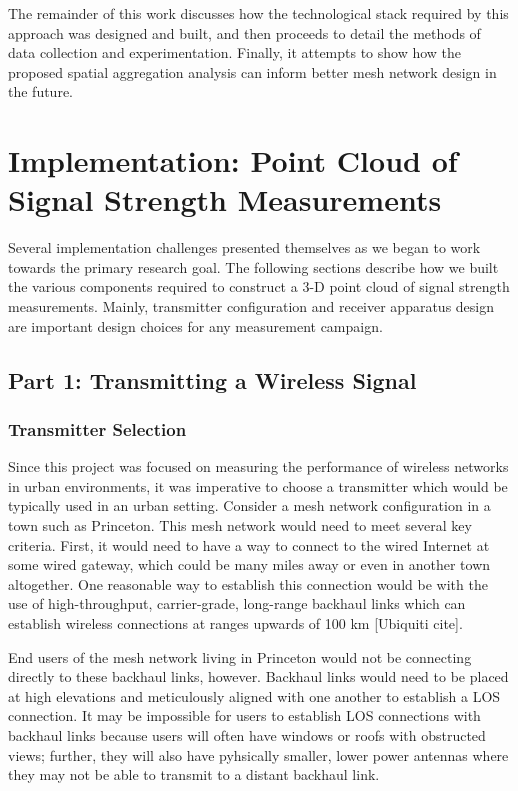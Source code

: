 \documentclass[pageno]{jpaper}
\begin{document}
The remainder of this work discusses how the technological stack required by this approach was designed and built, and then proceeds to detail the methods of data collection and experimentation. Finally, it attempts to show how the proposed spatial aggregation analysis can inform better mesh network design in the future.

\section{Implementation: Point Cloud of Signal Strength Measurements}
Several implementation challenges presented themselves as we began to work towards the primary research goal. The following sections describe how we built the various components required to construct a 3-D point cloud of signal strength measurements. Mainly, transmitter configuration and receiver apparatus design are  important design choices for any measurement campaign.

\subsection{Part 1: Transmitting a Wireless Signal}

\subsubsection{Transmitter Selection}
Since this project was focused on measuring the performance of wireless networks in urban environments, it was imperative to choose a transmitter which would be typically used in an urban setting. Consider a mesh network configuration in a town such as Princeton. This mesh network would need to meet several key criteria. First, it would need to have a way to connect to the wired Internet at some wired gateway, which could be many miles away or even in another town altogether. One reasonable way to establish this connection would be with the use of high-throughput, carrier-grade, long-range backhaul links which can establish wireless connections at ranges upwards of 100 km [Ubiquiti cite].

End users of the mesh network living in Princeton would not be connecting directly to these backhaul links, however. Backhaul links would need to be placed at high elevations and meticulously aligned with one another to establish a LOS connection. It may be impossible for users to establish LOS connections with backhaul links because users will often have windows or roofs with obstructed views; further, they will also have pyhsically smaller, lower power antennas where they may not be able to transmit to a distant backhaul link.
\end{document}
